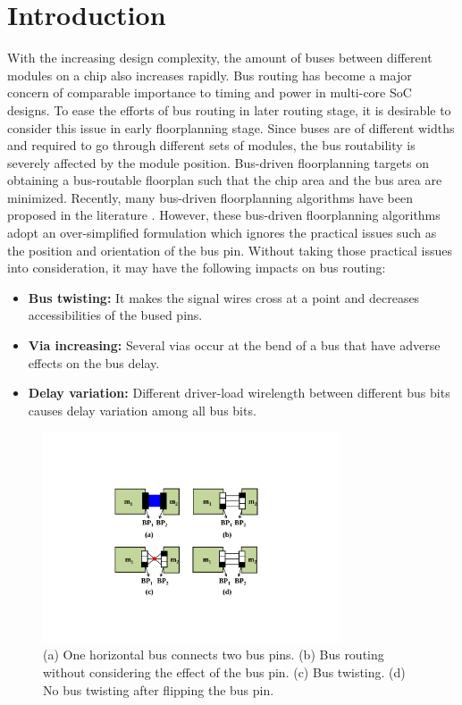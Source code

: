 \chapter{Introduction}
\label{chap::intro}

\baselineskip=26pt

\thispagestyle{empty}

\hspace{5mm}With the increasing design
complexity, the amount of buses between different modules on a
chip also increases rapidly. Bus routing has become a major
concern of comparable importance to timing and power in multi-core
SoC designs. To ease the efforts of bus routing in later routing
stage, it is desirable to consider this issue in early floorplanning
stage. Since buses are of different widths and required to go
through different sets of modules, the bus routability
is severely affected by the module position. Bus-driven
floorplanning targets on obtaining a bus-routable floorplan such
that the chip area and the bus area are
minimized. Recently, many bus-driven floorplanning algorithms have
been proposed in the literature \cite {Rafiq02, Xiang03, Chen05,
Law05, Xiang07, Ma08, Kim08_1, Kim08_2, Sheng10, He10, PH10}.
However, these bus-driven floorplanning algorithms
adopt an over-simplified formulation which ignores the practical
issues such as the position and orientation of the bus pin.
Without taking those practical issues into consideration,
it may have the following impacts on bus routing:
\begin{itemize}
\item \textbf{Bus twisting:} It makes the signal wires cross at a
point and decreases accessibilities of the bused pins.
\item \textbf{Via increasing:}
Several vias occur at the bend of a bus that have adverse effects
on the bus delay.
\item \textbf{Delay variation:} Different
driver-load wirelength between different bus bits causes
delay variation among all bus bits.
\end{itemize}

\begin{figure}[htb]
  \centering
    \includegraphics[width=8.8cm]{Fig/bus_twisting.pdf}
     \caption{
      (a) One horizontal bus connects two bus pins. (b) Bus routing without considering the effect of the bus pin. (c) Bus twisting. (d) No bus twisting after flipping the bus pin.
   }
  \label{fig::bus_twisting}
\end{figure}

